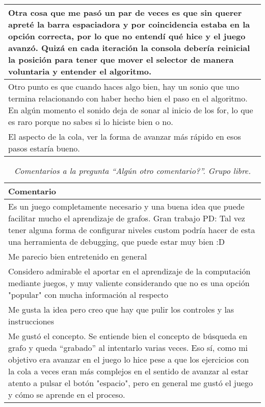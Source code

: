 \begin{table}[h]
\begin{tabular}{|p{\linewidth}|}
   Otra cosa que me pasó un par de veces es que sin querer apreté la barra espaciadora y por coincidencia estaba en la opción correcta, por lo que no entendí qué hice y el juego avanzó. Quizá en cada iteración la consola debería reinicial la posición para tener que mover el selector de manera voluntaria y entender el algoritmo. \\\hline
   
   Otro punto es que cuando haces algo bien, hay un sonio que uno termina relacionando con haber hecho bien el paso en el algoritmo. En algún momento el sonido deja de sonar al inicio de los for, lo que es raro porque no sabes si lo hiciste bien o no. \\\hline

   El aspecto de la cola, ver la forma de avanzar más rápido en esos pasos estaría bueno. \\
   \hline
   \end{tabular}
\end{table}

\restoregeometry



\begin{table}[h]
   \centering
   \caption*{\textit{Comentarios a la pregunta ``Algún otro comentario?''. Grupo libre.}}
   \begin{tabular}{|p{\linewidth}|}
   \hline %
   \textbf{Comentario} \\\hline
   Es un juego completamente necesario y una buena idea que puede facilitar mucho el aprendizaje de grafos. Gran trabajo
   PD: Tal vez tener alguna forma de configurar niveles custom podría hacer de esta una herramienta de debugging, que puede estar muy bien :D \\\hline
   Me parecio bien entretenido en general \\\hline
   
   Considero admirable el aportar en el aprendizaje de la computación mediante juegos, y muy valiente considerando que no es una opción "popular" con mucha información al respecto \\\hline
   Me gusta la idea pero creo que hay que pulir los controles y las instrucciones \\\hline
   Me gustó el concepto. Se entiende bien el concepto de búsqueda en grafo y queda ``grabado'' al intentarlo varias veces. Eso sí, como mi objetivo era avanzar en el juego lo hice pese a que los ejercicios con la cola a veces eran más complejos en el sentido de avanzar al estar atento a pulsar el botón "espacio", pero en general me gustó el juego y cómo se aprende en el proceso.
   \\\hline
   \end{tabular}
\end{table}

\restoregeometry
